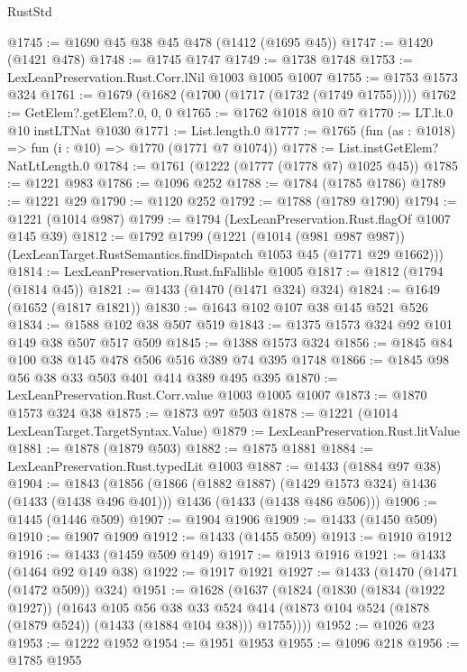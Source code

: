 \begin{lexlean}{RustStd}
\begin{coremodule}
@1745 := @1690 @45 @38 @45 @478 (@1412 (@1695 @45))
@1747 := @1420 (@1421 @478)
@1748 := @1745 @1747
@1749 := @1738 @1748
@1753 := LexLeanPreservation.Rust.Corr.lNil @1003 @1005 @1007
@1755 := @1753 @1573 @324
@1761 := @1679 (@1682 (@1700 (@1717 (@1732 (@1749 @1755)))))
@1762 := GetElem?.getElem?.{0, 0, 0}
@1765 := @1762 @1018 @10 @7
@1770 := LT.lt.{0} @10 instLTNat @1030
@1771 := List.length.{0}
@1777 := @1765 (fun (as : @1018) => fun (i : @10) => @1770 (@1771 @7 @1074))
@1778 := List.instGetElem?NatLtLength.{0}
@1784 := @1761 (@1222 (@1777 (@1778 @7) @1025 @45))
@1785 := @1221 @983
@1786 := @1096 @252
@1788 := @1784 (@1785 @1786)
@1789 := @1221 @29
@1790 := @1120 @252
@1792 := @1788 (@1789 @1790)
@1794 := @1221 (@1014 @987)
@1799 := @1794 (LexLeanPreservation.Rust.flagOf @1007 @145 @39)
@1812 := @1792
    @1799
    (@1221
      (@1014 (@981 @987 @987))
      (LexLeanTarget.RustSemantics.findDispatch @1053 @45 (@1771 @29 @1662)))
@1814 := LexLeanPreservation.Rust.fnFallible @1005
@1817 := @1812 (@1794 (@1814 @45))
@1821 := @1433 (@1470 (@1471 @324) @324)
@1824 := @1649 (@1652 (@1817 @1821))
@1830 := @1643 @102 @107 @38 @145 @521 @526
@1834 := @1588 @102 @38 @507 @519
@1843 := @1375 @1573 @324 @92 @101 @149 @38 @507 @517 @509
@1845 := @1388 @1573 @324
@1856 := @1845 @84 @100 @38 @145 @478 @506 @516 @389 @74 @395 @1748
@1866 := @1845 @98 @56 @38 @33 @503 @401 @414 @389 @495 @395
@1870 := LexLeanPreservation.Rust.Corr.value @1003 @1005 @1007
@1873 := @1870 @1573 @324 @38
@1875 := @1873 @97 @503
@1878 := @1221 (@1014 LexLeanTarget.TargetSyntax.Value)
@1879 := LexLeanPreservation.Rust.litValue
@1881 := @1878 (@1879 @503)
@1882 := @1875 @1881
@1884 := LexLeanPreservation.Rust.typedLit @1003
@1887 := @1433 (@1884 @97 @38)
@1904 := @1843
    (@1856
      (@1866 (@1882 @1887) (@1429 @1573 @324) @1436 (@1433 (@1438 @496 @401)))
      @1436
      (@1433 (@1438 @486 @506)))
@1906 := @1445 (@1446 @509)
@1907 := @1904 @1906
@1909 := @1433 (@1450 @509)
@1910 := @1907 @1909
@1912 := @1433 (@1455 @509)
@1913 := @1910 @1912
@1916 := @1433 (@1459 @509 @149)
@1917 := @1913 @1916
@1921 := @1433 (@1464 @92 @149 @38)
@1922 := @1917 @1921
@1927 := @1433 (@1470 (@1471 (@1472 @509)) @324)
@1951 := @1628
    (@1637
      (@1824
        (@1830
          (@1834 (@1922 @1927))
          (@1643
            @105
            @56
            @38
            @33
            @524
            @414
            (@1873 @104 @524 (@1878 (@1879 @524)) (@1433 (@1884 @104 @38)))
            @1755))))
@1952 := @1026 @23
@1953 := @1222 @1952
@1954 := @1951 @1953
@1955 := @1096 @218
@1956 := @1785 @1955

\end{coremodule}
\end{lexlean}
